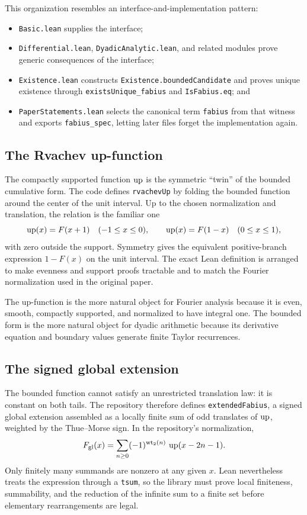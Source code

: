 \documentclass[11pt,oneside]{article}
\theoremstyle{definition}
\theoremstyle{remark}
\begin{document}
This organization resembles an interface-and-implementation pattern:
\begin{itemize}
  \item \nolinkurl{Basic.lean} supplies the interface;
  \item \nolinkurl{Differential.lean}, \nolinkurl{DyadicAnalytic.lean}, and related modules prove generic consequences of the interface;
  \item \nolinkurl{Existence.lean} constructs \nolinkurl{Existence.boundedCandidate} and proves unique existence through \nolinkurl{existsUnique_fabius} and \nolinkurl{IsFabius.eq}; and
  \item \nolinkurl{PaperStatements.lean} selects the canonical term \nolinkurl{fabius} from that witness and exports \nolinkurl{fabius_spec}, letting later files forget the implementation again.
\end{itemize}

\subsection{The Rvachev up-function}
The compactly supported function \(\operatorname{up}\) is the symmetric ``twin'' of the bounded cumulative form.  The code defines \nolinkurl{rvachevUp} by folding the bounded function around the center of the unit interval.  Up to the chosen normalization and translation, the relation is the familiar one
\[
   \operatorname{up}(x)=F(x+1) \quad (-1\leq x\leq0),
   \qquad
   \operatorname{up}(x)=F(1-x) \quad (0\leq x\leq1),
\]
with zero outside the support.  Symmetry gives the equivalent positive-branch expression \(1-F(x)\) on the unit interval.  The exact Lean definition is arranged to make evenness and support proofs tractable and to match the Fourier normalization used in the original paper.

The up-function is the more natural object for Fourier analysis because it is even, smooth, compactly supported, and normalized to have integral one.  The bounded form is the more natural object for dyadic arithmetic because its derivative equation and boundary values generate finite Taylor recurrences.

\subsection{The signed global extension}
The bounded function cannot satisfy an unrestricted translation law: it is constant on both tails.  The repository therefore defines \nolinkurl{extendedFabius}, a signed global extension assembled as a locally finite sum of odd translates of \(\operatorname{up}\), weighted by the Thue--Morse sign.  In the repository's normalization,
\[
  F_{\mathrm{gl}}(x)=\sum_{n\geq0}(-1)^{\operatorname{wt}_{2}(n)}\,\operatorname{up}(x-2n-1).
\]
Only finitely many summands are nonzero at any given \(x\).  Lean nevertheless treats the expression through a \nolinkurl{tsum}, so the library must prove local finiteness, summability, and the reduction of the infinite sum to a finite set before elementary rearrangements are legal.
\end{document}
